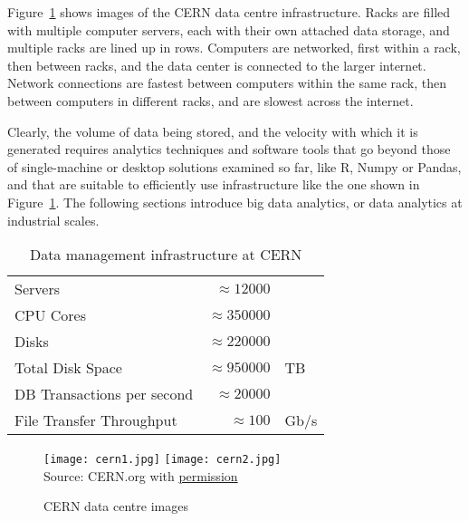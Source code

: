 Figure~\ref{fig:cerndata} shows images of the CERN data centre infrastructure. Racks are filled with multiple computer servers, each with their own attached data storage, and multiple racks are lined up in rows. Computers are networked, first within a rack, then between racks, and the data center is connected to the larger internet. Network connections are fastest between computers within the same rack, then between computers in different racks, and are slowest across the internet. 

Clearly, the volume of data being stored, and the velocity with which it is generated requires analytics techniques and software tools that go beyond those of single-machine or desktop solutions examined so far, like R, Numpy or Pandas, and that are suitable to efficiently use infrastructure like the one shown in Figure~\ref{fig:cerndata}. The following sections introduce big data analytics, or data analytics at industrial scales. 

\begin{table}
\centering

\renewcommand{\arraystretch}{1.25}
\begin{tabular}{l r l} \hline
Servers & $\approx 12000$ \\
CPU Cores & $\approx 350000$ \\
Disks & $\approx 220000$ \\
Total Disk Space & $\approx 950000$ & TB \\ 
DB Transactions per second & $\approx 20000$ \\ 
File Transfer Throughput & $\approx 100$ & Gb/s\\  \hline
\end{tabular}
\caption[Data management infrastructure at CERN]{Data management infrastructure at CERN\footnotemark}
\label{tab:cern}
\end{table}

\begin{figure}
\centering

\texttt{[image: cern1.jpg]} \hfill
\texttt{[image: cern2.jpg]} \\

\scriptsize Source: CERN.org with \href{https://copyright.web.cern.ch/}{permission} \normalsize
\caption{CERN data centre images}
\label{fig:cerndata}
\end{figure}

